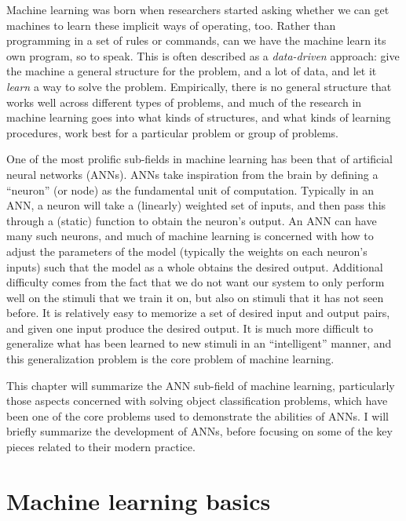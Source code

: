 Machine learning was born when researchers started asking whether
we can get machines to learn these implicit ways of operating, too.
Rather than programming in a set of rules or commands,
can we have the machine learn its own program, so to speak.
This is often described as a \emph{data-driven} approach:
give the machine a general structure for the problem,
and a lot of data,
and let it \emph{learn} a way to solve the problem.
Empirically, there is no general structure that works well across
different types of problems,
and much of the research in machine learning goes into
what kinds of structures, and what kinds of learning procedures,
work best for a particular problem or group of problems.

One of the most prolific sub-fields in machine learning has been that of
artificial neural networks (ANNs).
ANNs take inspiration from the brain
by defining a ``neuron'' (or node) as the fundamental unit of computation.
Typically in an ANN,
a neuron will take a (linearly) weighted set of inputs,
and then pass this through a (static) function to obtain the neuron's output.
An ANN can have many such neurons,
and much of machine learning is concerned with how to adjust the parameters of the model
(typically the weights on each neuron's inputs)
such that the model as a whole obtains the desired output.
Additional difficulty comes from the fact that we do not want our system to
only perform well on the stimuli that we train it on,
but also on stimuli that it has not seen before.
It is relatively easy to memorize a set of desired input and output pairs,
and given one input produce the desired output.
It is much more difficult to generalize what has been learned to new
stimuli in an ``intelligent'' manner,
and this generalization problem is the core problem of machine learning.

This chapter will summarize the ANN sub-field of machine learning,
particularly those aspects concerned with solving object classification problems,
which have been one of the core problems used to demonstrate the abilities of ANNs.
I will briefly summarize the development of ANNs,
before focusing on some of the key pieces related to their modern practice.


\section{Machine learning basics}

